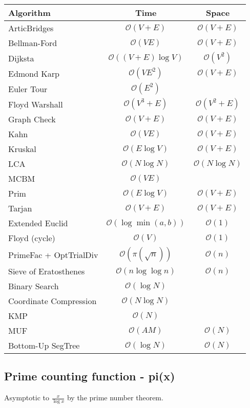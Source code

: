 \documentclass[a4paper]{article}
\begin{document}
\begin{table}[ht]
  \centering
  \begin{tabular}{lcc}
    \hline
    Algorithm & Time & Space \\
    \hline
    \hline
    ArticBridges & $\mathcal{O}(V+E)$ & $\mathcal{O}(V+E)$ \\
    Bellman-Ford & $\mathcal{O}(VE)$ & $\mathcal{O}(V+E)$ \\
    Dijksta & $\mathcal{O}((V+E) \log V)$ & $\mathcal{O}(V^2)$ \\
    Edmond Karp & $\mathcal{O}(VE^2)$ & $\mathcal{O}(V+E)$ \\
    Euler Tour & $\mathcal{O}(E^2)$ & \\
    Floyd Warshall & $\mathcal{O}(V^3+E)$ & $\mathcal{O}(V^2+E)$ \\
    Graph Check & $\mathcal{O}(V+E)$ & $\mathcal{O}(V+E)$ \\
    Kahn & $\mathcal{O}(VE)$ & $\mathcal{O}(V+E)$ \\
    Kruskal & $\mathcal{O}(E \log V)$ & $\mathcal{O}(V+E)$ \\
    LCA & $\mathcal{O}(N \log N)$ & $\mathcal{O}(N \log N)$ \\
    MCBM & $\mathcal{O}(VE)$ & \\
    Prim & $\mathcal{O}(E \log V)$ & $\mathcal{O}(V+E)$ \\
    Tarjan & $\mathcal{O}(V+E)$ & $\mathcal{O}(V+E)$ \\
    Extended Euclid & $\mathcal{O}(\log \min(a, b))$ & $\mathcal{O}(1)$ \\
    Floyd (cycle) & $\mathcal{O}(V)$ & $\mathcal{O}(1)$ \\
    PrimeFac + OptTrialDiv & $\mathcal{O}(\pi(\sqrt{n}))$ & $\mathcal{O}(n)$ \\
    Sieve of Eratosthenes & $\mathcal{O}(n \log \log n)$ & $\mathcal{O}(n)$ \\
    Binary Search & $\mathcal{O}(\log N)$ & \\
    Coordinate Compression & $\mathcal{O}(N \log N)$ & \\
    KMP & $\mathcal{O}(N)$ & \\
    MUF & $\mathcal{O}(AM)$ & $\mathcal{O}(N)$ \\
    Bottom-Up SegTree & $\mathcal{O}(\log N)$ & $\mathcal{O}(N)$ \\
    \hline
  \end{tabular}
\end{table}

\subsection{Prime counting function - pi(x)}
Asymptotic to $\frac{x}{\log x}$ by the prime number theorem.
\end{document}
